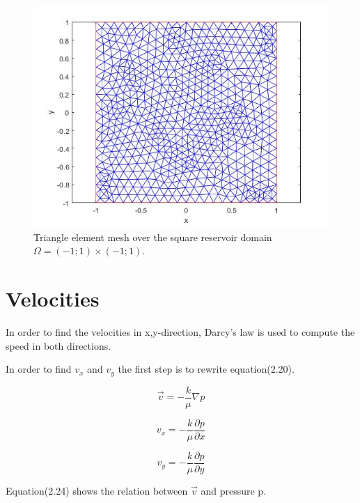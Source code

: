 \documentclass[a4paper]{report}
\begin{document}
\begin{figure}[h]
	\centering
	\includegraphics[width=150mm]{meshgrid2D.jpg}
	\caption{Triangle element mesh over the square reservoir domain $\Omega=(-1;1)\times (-1;1)$. \label{overflow}}
\end{figure}


\section{Velocities}

In order to find the velocities in x,y-direction, Darcy's law is used to compute the speed in both directions.


In order to find $v_x$ and $v_y$ the first step is to rewrite equation(2.20).

\begin{equation}
\vec{v}=-\frac{k}{\mu}\nabla p
\end{equation}

\begin{equation}
v_x=-\frac{k}{\mu}\frac{\partial p}{\partial x}
\end{equation}


\begin{equation}
v_y=-\frac{k}{\mu}\frac{\partial p}{\partial y}
\end{equation}

Equation(2.24) shows the relation between $\vec{v}$ and pressure p.
\end{document}
